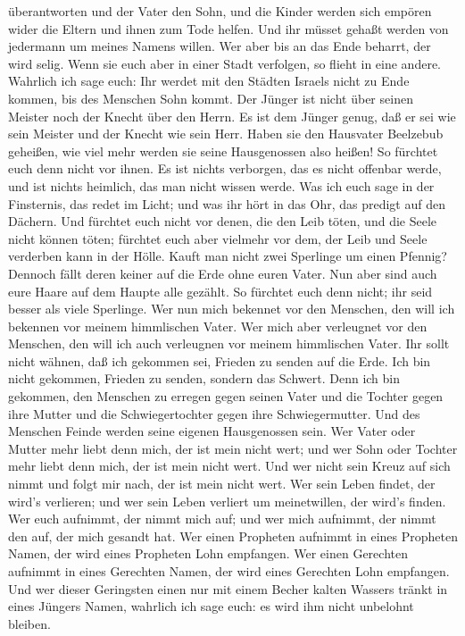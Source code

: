 überantworten und der Vater den Sohn, und die Kinder werden sich empören
wider die Eltern und ihnen zum Tode helfen.  Und ihr müsset
gehaßt werden von jedermann um meines Namens willen. Wer aber bis an das
Ende beharrt, der wird selig.  Wenn sie euch aber in einer
Stadt verfolgen, so flieht in eine andere. Wahrlich ich sage euch: Ihr
werdet mit den Städten Israels nicht zu Ende kommen, bis des Menschen
Sohn kommt.  Der Jünger ist nicht über seinen Meister noch
der Knecht über den Herrn.  Es ist dem Jünger genug, daß er
sei wie sein Meister und der Knecht wie sein Herr. Haben sie den
Hausvater Beelzebub geheißen, wie viel mehr werden sie seine
Hausgenossen also heißen!  So fürchtet euch denn nicht vor
ihnen. Es ist nichts verborgen, das es nicht offenbar werde, und ist
nichts heimlich, das man nicht wissen werde.  Was ich euch
sage in der Finsternis, das redet im Licht; und was ihr hört in das Ohr,
das predigt auf den Dächern.  Und fürchtet euch nicht vor
denen, die den Leib töten, und die Seele nicht können töten; fürchtet
euch aber vielmehr vor dem, der Leib und Seele verderben kann in der
Hölle.  Kauft man nicht zwei Sperlinge um einen Pfennig?
Dennoch fällt deren keiner auf die Erde ohne euren Vater. 
Nun aber sind auch eure Haare auf dem Haupte alle gezählt. 
So fürchtet euch denn nicht; ihr seid besser als viele Sperlinge.
 Wer nun mich bekennet vor den Menschen, den will ich
bekennen vor meinem himmlischen Vater.  Wer mich aber
verleugnet vor den Menschen, den will ich auch verleugnen vor meinem
himmlischen Vater.  Ihr sollt nicht wähnen, daß ich
gekommen sei, Frieden zu senden auf die Erde. Ich bin nicht gekommen,
Frieden zu senden, sondern das Schwert.  Denn ich bin
gekommen, den Menschen zu erregen gegen seinen Vater und die Tochter
gegen ihre Mutter und die Schwiegertochter gegen ihre Schwiegermutter.
 Und des Menschen Feinde werden seine eigenen Hausgenossen
sein.  Wer Vater oder Mutter mehr liebt denn mich, der ist
mein nicht wert; und wer Sohn oder Tochter mehr liebt denn mich, der ist
mein nicht wert.  Und wer nicht sein Kreuz auf sich nimmt
und folgt mir nach, der ist mein nicht wert.  Wer sein
Leben findet, der wird's verlieren; und wer sein Leben verliert um
meinetwillen, der wird's finden.  Wer euch aufnimmt, der
nimmt mich auf; und wer mich aufnimmt, der nimmt den auf, der mich
gesandt hat.  Wer einen Propheten aufnimmt in eines
Propheten Namen, der wird eines Propheten Lohn empfangen. Wer einen
Gerechten aufnimmt in eines Gerechten Namen, der wird eines Gerechten
Lohn empfangen.  Und wer dieser Geringsten einen nur mit
einem Becher kalten Wassers tränkt in eines Jüngers Namen, wahrlich ich
sage euch: es wird ihm nicht unbelohnt bleiben.


